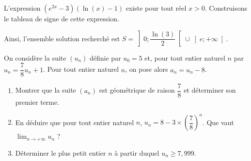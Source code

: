 \documentclass[11pt,fleqn, openany]{book} %
\begin{document}
\begin{solution}

L'expression \((e^{2x}-3)(\ln(x)-1)\) existe pour tout réel \(x > 0\). Construisons le tableau de signe de cette expression.


\begin{center}\end{center}


Ainsi, l'ensemble solution recherché est \(S=\left]0;\dfrac{\ln(3)}{2}\right[ \cup \left]e;+\infty\right[\).

\end{solution}




\begin{exercise}[topic=log03]On considère la suite $(u_n)$ définie par $u_0=5$ et, pour tout entier naturel $n$ par $u_n=\dfrac{7}{8}u_n+1$. Pour tout entier naturel $n$, on pose alors $a_n=u_n-8$.
\begin{enumerate}
\item Montrer que la suite $(a_n)$ est géométrique de raison $\dfrac{7}{8}$ et déterminer son premier terme.
\item En déduire que pour tout entier naturel $n$, $u_n=8-3\times\left(\dfrac{7}{8}\right)^n$. Que vaut $\displaystyle\lim_{n \to +\infty}u_n$ ?
\item Déterminer le plus petit entier $n$ à partir duquel $u_n \geqslant 7,999$.
\end{enumerate}\end{exercise}
\end{document}
